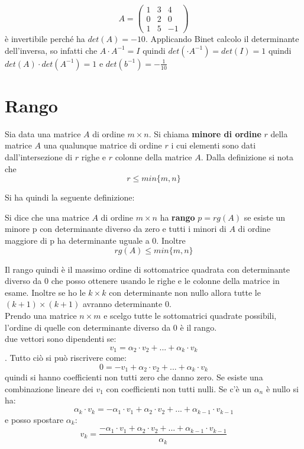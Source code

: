 \documentclass[a4paper,12pt, oneside]{book}
\begin{document}
\begin{esercizio}
	$$
		A=\left(\begin{matrix}
				1 & 3 & 4  \\
				0 & 2 & 0  \\
				1 & 5 & -1
			\end{matrix}\right)
	$$
	è invertibile perché ha $det(A)=-10$. Applicando Binet calcolo il determinante dell'inversa, so infatti che $A\cdot A^{-1}=I$ quindi $det(\cdot A^{-1})=det(I)=1$ quindi $det(A)\cdot det(A^{-1})=1$ e $det(b^{-1})=-\frac{1}{10}$
\end{esercizio}
\newpage
\section{Rango}
\begin{definizione}
	Sia data una matrice $A$ di ordine $m\times n$. Si chiama \textbf{minore di ordine} $r$ della matrice $A$ una qualunque matrice di ordine $r$ i cui elementi sono dati dall'intersezione di $r$ righe e $r$ colonne della matrice $A$. Dalla definizione si nota che $$r\leq min\{m,n\}$$
\end{definizione}
Si ha quindi la seguente definizione:
\begin{definizione}
	Si dice che una matrice $A$ di ordine $m\times n$ ha \textbf{rango} $p=rg(A)$ se esiste un minore p con determinante diverso da zero e tutti i minori di $A$ di ordine maggiore di p ha determinante uguale a $0$. Inoltre
	$$rg(A)\leq min\{m,n\}$$
\end{definizione}
Il rango quindi è il massimo ordine di sottomatrice quadrata con determinante diverso da 0 che posso ottenere usando le righe e le colonne della matrice in esame. Inoltre se ho le $k\times k$ con determinante non nullo allora tutte le $(k+1)\times(k+1)$ avranno determinante 0.\\
Prendo una matrice $n\times m$ e scelgo tutte le sottomatrici quadrate possibili, l'ordine di quelle con determinante diverso da 0 è il rango.\\
due vettori sono dipendenti se: $$v_1=\alpha_2\cdot v_2+...+ \alpha_k\cdot v_k$$. Tutto ciò si può riscrivere come: $$0=-v_1+\alpha_2\cdot v_2+...+ \alpha_k\cdot v_k$$ quindi si hanno coefficienti non tutti zero che danno zero. Se esiste una combinazione lineare dei $v_1$ con coefficienti non tutti nulli. Se c'è un $\alpha_n$ è nullo si ha: $$\alpha_k\cdot v_k=-\alpha_1\cdot v_1+\alpha_2\cdot v_2+...+ \alpha_{k-1}\cdot v_{k-1}$$ e posso spostare $\alpha_ k$: $$v_k=\frac{-\alpha_1\cdot v_1+\alpha_2\cdot v_2+...+ \alpha_{k-1}\cdot v_{k-1}}{\alpha_k}$$
\end{document}
